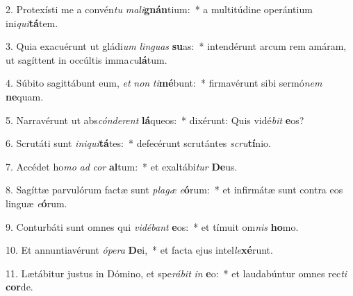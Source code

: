 2. Protexísti me a convén\textit{tu} \textit{ma}\textit{li}\textbf{gnán}tium:~*  a multitúdine operántium ini\textit{qui}\textbf{tá}tem.\

3. Quia exacuérunt ut gládi\textit{um} \textit{lin}\textit{guas} \textbf{su}as:~*  intendérunt arcum rem amáram, ut sagíttent in occúltis imma\textit{cu}\textbf{lá}tum.\

4. Súbito sagittábunt eum, \textit{et} \textit{non} \textit{ti}\textbf{mé}bunt:~*  firmavérunt sibi sermó\textit{nem} \textbf{ne}quam.\

5. Narravérunt ut abs\textit{cón}\textit{de}\textit{rent} \textbf{lá}queos:~*  dixérunt: Quis vidé\textit{bit} \textbf{e}os?\

6. Scrutáti sunt \textit{in}\textit{i}\textit{qui}\textbf{tá}tes:~*  defecérunt scrutántes \textit{scru}\textbf{tí}nio.\

7. Accédet ho\textit{mo} \textit{ad} \textit{cor} \textbf{al}tum:~*  et exaltábi\textit{tur} \textbf{De}us.\

8. Sagíttæ parvulórum factæ sunt \textit{pla}\textit{gæ} \textit{e}\textbf{ó}rum:~*  et infirmátæ sunt contra eos linguæ \textit{e}\textbf{ó}rum.\

9. Conturbáti sunt omnes qui \textit{vi}\textit{dé}\textit{bant} \textbf{e}os:~*  et tímuit om\textit{nis} \textbf{ho}mo.\

10. Et annuntiavérunt \textit{ó}\textit{pe}\textit{ra} \textbf{De}i,~*  et facta ejus intel\textit{le}\textbf{xé}runt.\

11. Lætábitur justus in Dómino, et spe\textit{rá}\textit{bit} \textit{in} \textbf{e}o:~*  et laudabúntur omnes rec\textit{ti} \textbf{cor}de.\

